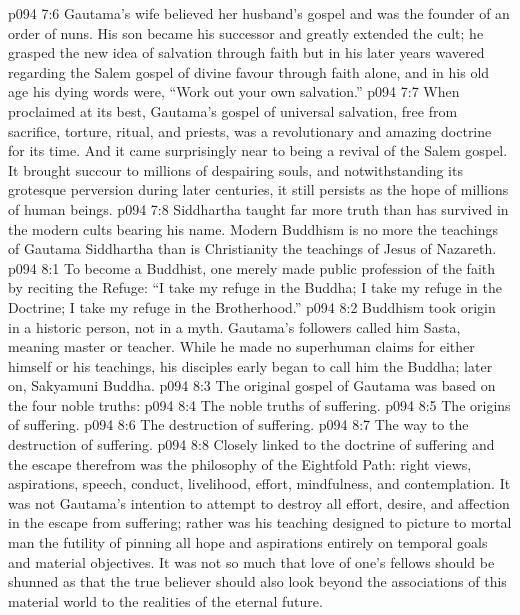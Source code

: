 \vs p094 7:6 Gautama’s wife believed her husband’s gospel and was the founder of an order of nuns. His son became his successor and greatly extended the cult; he grasped the new idea of salvation through faith but in his later years wavered regarding the Salem gospel of divine favour through faith alone, and in his old age his dying words were, “Work out your own salvation.”
\vs p094 7:7 \pc When proclaimed at its best, Gautama’s gospel of universal salvation, free from sacrifice, torture, ritual, and priests, was a revolutionary and amazing doctrine for its time. And it came surprisingly near to being a revival of the Salem gospel. It brought succour to millions of despairing souls, and notwithstanding its grotesque perversion during later centuries, it still persists as the hope of millions of human beings.
\vs p094 7:8 Siddhartha taught far more truth than has survived in the modern cults bearing his name. Modern Buddhism is no more the teachings of Gautama Siddhartha than is Christianity the teachings of Jesus of Nazareth.
\vs p094 8:1 To become a Buddhist, one merely made public profession of the faith by reciting the Refuge: “I take my refuge in the Buddha; I take my refuge in the Doctrine; I take my refuge in the Brotherhood.”
\vs p094 8:2 Buddhism took origin in a historic person, not in a myth. Gautama’s followers called him Sasta, meaning master or teacher. While he made no superhuman claims for either himself or his teachings, his disciples early began to call him  the Buddha; later on, Sakyamuni Buddha.
\vs p094 8:3 \pc The original gospel of Gautama was based on the four noble truths:
\vs p094 8:4 \bibnobreakspace The noble truths of suffering.
\vs p094 8:5 \bibnobreakspace The origins of suffering.
\vs p094 8:6 \bibnobreakspace The destruction of suffering.
\vs p094 8:7 \bibnobreakspace The way to the destruction of suffering.
\vs p094 8:8 \pc Closely linked to the doctrine of suffering and the escape therefrom was the philosophy of the Eightfold Path: right views, aspirations, speech, conduct, livelihood, effort, mindfulness, and contemplation. It was not Gautama’s intention to attempt to destroy all effort, desire, and affection in the escape from suffering; rather was his teaching designed to picture to mortal man the futility of pinning all hope and aspirations entirely on temporal goals and material objectives. It was not so much that love of one’s fellows should be shunned as that the true believer should also look beyond the associations of this material world to the realities of the eternal future.
